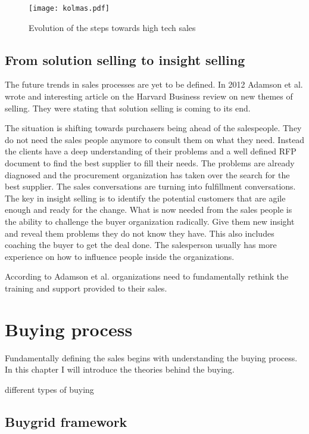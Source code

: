\documentclass[12pt,a4paper,oneside,pdftex]{report}
\begin{document}
\begin{figure}[ht]
  \begin{center}
    \texttt{[image: kolmas.pdf]}
    \caption{Evolution of the steps towards high tech sales}
    \label{fig:kolmas}
  \end{center}
\end{figure}

\subsection{From solution selling to insight selling}
The future trends in sales processes are yet to be defined. In 2012 Adamson et al. wrote and interesting article on the Harvard Business review on new themes of selling. They were stating that solution selling is coming to its end. 

The situation is shifting towards purchasers being ahead of the salespeople. They do not need the sales people anymore to consult them on what they need. Instead the clients have a deep understanding of their problems and a well defined RFP document to find the best supplier to fill their needs. The problems are already diagnosed and the procurement organization has taken over the search for the best supplier. The sales conversations are turning into fulfillment conversations. 
The key in insight selling is to identify the potential customers that are agile enough and ready for the change. What is now needed from the sales people is the ability to challenge the buyer organization radically. Give them new insight and reveal them problems they do not know they have. 
This also includes coaching the buyer to get the deal done. The salesperson usually has more experience on how to influence people inside the organizations. 

According to Adamson et al. organizations need to fundamentally rethink the training and support provided to their sales. 

\section{Buying process}


Fundamentally defining the sales begins with understanding the buying process. In this chapter I will introduce the theories behind the buying. 

different types of buying

\subsection{Buygrid framework}
\end{document}
